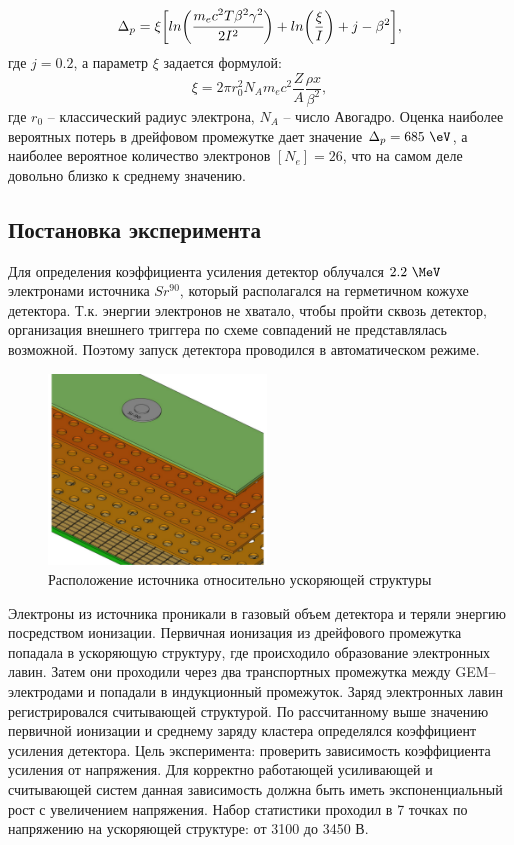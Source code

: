 \begin{equation}
\Delta_p = \xi\biggl[ln \bigg(\cfrac{ m_ec^2T\beta^2\gamma^2}{2I^2}\bigg) + ln\bigg(\frac{\xi}{I}\bigg) + j - \beta^2 \biggr],
\label{eq:MP_energy_loss}
\end{equation}
где $j=0.2$, а параметр $\xi$ задается формулой:
\begin{equation}
\xi = 2\pi r_0^2 N_A m_ec^2\frac{Z}{A} \frac{\rho x} {\beta^2}, 
\end{equation}
где $r_0$ -- классический радиус электрона, $N_A$ -- число Авогадро. Оценка наиболее вероятных потерь в дрейфовом промежутке дает значение  $\Delta_p = 685~\eV$, а наиболее вероятное количество электронов $[N_e] = 26$, что на самом деле довольно близко к среднему значению.
\subsection{Постановка эксперимента}
Для определения коэффициента усиления детектор облучался $2.2~\MeV$ электронами источника $Sr^{90}$, который располагался на герметичном кожухе детектора. Т.к. энергии электронов не хватало, чтобы пройти сквозь детектор, организация внешнего триггера по схеме совпадений не представлялась возможной. Поэтому запуск детектора проводился в автоматическом режиме.
\begin{figure}[H]
	\centering
	\includegraphics[height = 4 cm, width= 5.8cm]{img/GEM_Sr_source.pdf}
	\caption{Расположение источника относительно ускоряющей структуры}
	\label{fig:det_scheme+sr90}
\end{figure}
Электроны из источника проникали в газовый объем детектора и теряли энергию посредством ионизации. 
Первичная ионизация из дрейфового промежутка попадала в ускоряющую структуру, где происходило образование электронных лавин. Затем они проходили через два транспортных промежутка между GEM--электродами и попадали в индукционный промежуток. Заряд электронных лавин регистрировался считывающей структурой. По рассчитанному выше значению первичной ионизации и среднему заряду кластера определялся коэффициент усиления детектора. Цель эксперимента: проверить зависимость коэффициента усиления от напряжения. Для корректно работающей усиливающей и считывающей систем данная зависимость должна быть иметь экспоненциальный рост с увеличением напряжения. Набор статистики проходил в 7 точках по напряжению на ускоряющей структуре: от 3100 до 3450 В.

